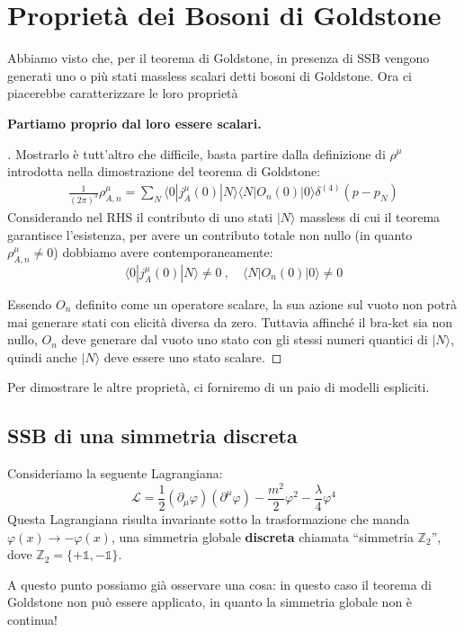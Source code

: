 \documentclass[../main.tex]{subfiles}
\begin{document}
\section{Proprietà dei Bosoni di Goldstone}
Abbiamo visto che, per il teorema di Goldstone, in presenza di SSB vengono generati uno o più stati massless scalari detti bosoni di Goldstone. Ora ci piacerebbe caratterizzare le loro proprietà 

\textbf{Partiamo proprio dal loro essere scalari.}
\begin{proof}[]Mostrarlo è tutt'altro che difficile, basta partire dalla definizione di $\rho^\mu$ introdotta nella dimostrazione del teorema di Goldstone:
\begin{align*}
    \frac{1}{(2\pi)^3}\rho^\mu_{A,n} =  \sum_N\langle 0|j^\mu_A(0) |N\rangle\langle N| O_n(0)|0\rangle \delta^{(4)}(p-p_N)
\end{align*}
Considerando nel RHS il contributo di uno stati $|N\rangle$ massless di cui il teorema garantisce l'esistenza, per avere un contributo totale non nullo (in quanto $\rho^\mu_{A,n}\neq 0$) dobbiamo avere contemporaneamente:
\[
\langle 0|j^\mu_A(0) |N\rangle\neq 0~, \quad\langle N| O_n(0)|0\rangle\neq 0
\]

Essendo $O_n$ definito come un operatore scalare, la sua azione sul vuoto non potrà mai generare stati con elicità diversa da zero. Tuttavia affinché il bra-ket sia non nullo, $O_n$ deve generare dal vuoto uno stato con gli stessi numeri quantici di $|N\rangle$, quindi anche $|N\rangle$ deve essere uno stato scalare.
\end{proof}

Per dimostrare le altre proprietà, ci forniremo di un paio di modelli espliciti.

\subsection{SSB di una simmetria discreta}
Consideriamo la seguente Lagrangiana:
\begin{equation}
    \mathscr{L} = \frac{1}{2}(\partial_\mu\varphi)(\partial^\mu\varphi) - \frac{m^2}{2}\varphi^2  - \frac{\lambda}{4}\varphi^4
    \label{eq:lambda_phi^4_lagrangian}
\end{equation}
Questa Lagrangiana risulta invariante sotto la trasformazione che manda $\varphi(x) \rightarrow -\varphi(x)$, una simmetria globale \textbf{discreta} chiamata “simmetria $\mathbb{Z}_2$”, dove $\mathbb{Z}_2=\{+\mathbb{1},-\mathbb{1}\}$.

A questo punto possiamo già osservare una cosa: in questo caso il teorema di Goldstone non può essere applicato, in quanto la simmetria globale non è continua! 
\end{document}

